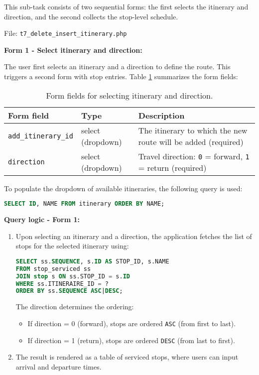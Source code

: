 \documentclass[a4paper, 12pt]{article}
\begin{document}
This sub-task consists of two sequential forms: the first selects the itinerary and direction, and the second collects the stop-level schedule.

File: \texttt{t7\_delete\_insert\_itinerary.php}

\textbf{Form 1 - Select itinerary and direction:}

The user first selects an itinerary and a direction to define the route. This triggers a second form with stop entries. Table \ref{tab:p3-t7-select-itinerary} summarizes the form fields:

\begin{table}[H]
    \centering
    \footnotesize
    \caption{Form fields for selecting itinerary and direction.}
    \label{tab:p3-t7-select-itinerary}
    \begin{tabular}{lll}
        \toprule
        \textbf{Form field} & \textbf{Type} & \textbf{Description} \\
        \midrule
        \texttt{add\_itinerary\_id} & select (dropdown) & The itinerary to which the new route will be added  (required) \\
        \texttt{direction}          & select (dropdown) & Travel direction: \texttt{0} = forward, \texttt{1} = return  (required) \\
        \bottomrule
    \end{tabular}
\end{table}

To populate the dropdown of available itineraries, the following query is used:

\begin{lstlisting}[language=SQL]
SELECT ID, NAME FROM itinerary ORDER BY NAME;
\end{lstlisting}

\textbf{Query logic - Form 1:}
\begin{enumerate}
    \item Upon selecting an itinerary and a direction, the application fetches the list of stops for the selected itinerary using:
    \begin{lstlisting}[language=SQL]
SELECT ss.SEQUENCE, s.ID AS STOP_ID, s.NAME
FROM stop_serviced ss
JOIN stop s ON ss.STOP_ID = s.ID
WHERE ss.ITINERAIRE_ID = ?
ORDER BY ss.SEQUENCE ASC|DESC;
    \end{lstlisting}
    The direction determines the ordering:
    \begin{itemize}
        \item If direction = 0 (forward), stops are ordered \texttt{ASC} (from first to last).
        \item If direction = 1 (return), stops are ordered \texttt{DESC} (from last to first).
    \end{itemize}
    \item The result is rendered as a table of serviced stops, where users can input arrival and departure times.
\end{enumerate}
\end{document}
